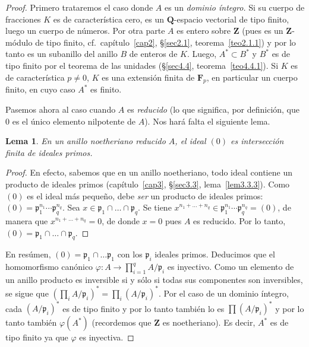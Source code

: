\documentclass[oneside,bibtotoc,leqno,spanish]{amsbook}
\newcommand{\QQ}{\mathbf{Q}}
\newcommand{\ZZ}{\mathbf{Z}}
\newcommand{\FF}{\mathbf{F}}
\newcommand{\idl}[1]{\mathfrak{#1}}
\renewcommand{\to}[1][]{\xrightarrow{#1}}
\numberwithin{equation}{section}
\theoremstyle{defi}
\theoremstyle{note}
\newtheorem*{lemma*}{Lema}
\theoremstyle{rem}
\numberwithin{theorem}{section}
\numberwithin{proposition}{section}
\numberwithin{definition}{section}
\numberwithin{lemma}{section}
\numberwithin{corollary}{section}
\numberwithin{example}{section}
\numberwithin{footnote}{section}%
\begin{document}
\begin{proof}
Primero trataremos el caso donde $A$ es un {\em dominio \'integro.} Si su cuerpo de fracciones $K$ es
de caracter\'istica cero, es un $\QQ$-espacio vectorial de tipo finito, luego un cuerpo de n\'umeros.
Por otra parte $A$ es entero sobre $\ZZ$ (pues es un $\ZZ$-m\'odulo de tipo finito,
cf.~cap\'itulo~\ref{cap2}, \S\ref{sec2.1}, teorema~\ref{teo2.1.1})
y por lo tanto es un subanillo del anillo $B$ de enteros de $K$. Luego, $A^{*}\subset B^{*}$ y $B^{*}$ es
de tipo finito por el teorema de las unidades (\S\ref{sec4.4}, teorema~\ref{teo4.4.1}). Si $K$ es de caracter\'istica $p\neq 0$, $K$
es una extensi\'on finita de $\FF_{p}$, en particular un cuerpo finito, en cuyo caso $A^{*}$ es finito.

Pasemos ahora al caso cuando $A$ es {\em reducido} (lo que significa, por definici\'on, que $0$ es el
\'unico elemento nilpotente de $A$). Nos har\'a falta el siguiente lema.

\begin{lemma*}
En un anillo noetheriano reducido $A$, el ideal $(0)$ es intersecci\'on finita de ideales primos.
\end{lemma*}

\begin{proof}
En efecto, sabemos que en un anillo noetheriano, todo ideal contiene un producto de ideales primos
(cap\'itulo~\ref{cap3}, \S\ref{sec3.3}, lema~\ref{lem3.3.3}).
Como $(0)$ es el ideal m\'as peque\~no, debe {\em ser} un producto de ideales primos:
$(0) = \idl{p}_{1}^{n_{1}}\cdots\idl{p}_{q}^{n_{q}}$. Sea $x\in\idl{p}_{1}\cap\dots\cap\idl{p}_{q}$. Se
tiene $x^{n_{1}+\dots+n_{q}}\in\idl{p}_{1}^{n_{1}}\cdots\idl{p}_{q}^{n_{q}} = (0)$, de manera que
$x^{n_{1}+\dots+n_{q}}=0$, de donde $x = 0$ pues $A$ es reducido. Por lo tanto, $(0) = \idl{p}_{1}\cap\dots\cap\idl{p}_{q}$.
\end{proof}

En res\'umen, $(0) = \idl{p}_{1}\cap\dots\idl{p}_{1}$ con los $\idl{p}_{i}$ ideales primos. Deducimos que
el homomorfismo can\'onico $\varphi:A\to\prod_{i=1}^{q}A/\idl{p}_{i}$ es inyectivo. Como un elemento de un anillo
producto es inversible si y s\'olo si todas sus componentes son inversibles, se sigue que
$\left(\prod_{i}A/\idl{p}_{i}\right)^{*}=\prod_{i}(A/\idl{p}_{i})^{*}$. Por el caso de un dominio \'integro, cada
$(A/\idl{p}_{i})^{*}$ es de tipo finito y por lo tanto tambi\'en lo es $\prod(A/\idl{p}_{i})^{*}$ y por lo tanto
tambi\'en $\varphi(A^{*})$ (recordemos que $\ZZ$ es noetheriano). Es decir, $A^{*}$ es de tipo finito ya que
$\varphi$ es inyectiva.


\end{proof}
\end{document}
